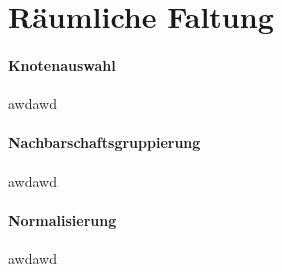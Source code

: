 \section{Räumliche Faltung}
\label{raeumliche_faltung}

\paragraph{Knotenauswahl}
\label{knotenauswahl}

awdawd

\paragraph{Nachbarschaftsgruppierung}
\label{nachbarschaftsgruppierung}

awdawd

\paragraph{Normalisierung}
\label{normalisierung}

awdawd
